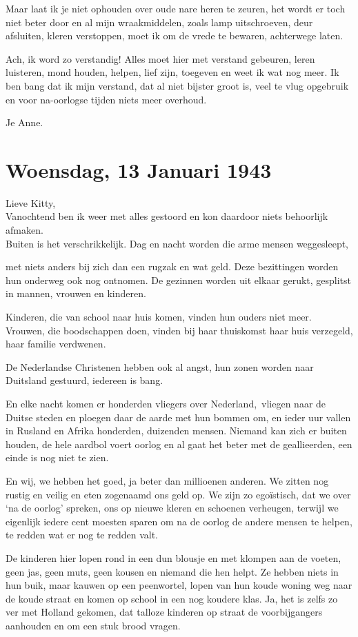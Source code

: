 \documentclass{book}
\begin{document}
Maar laat ik je niet ophouden over oude nare heren te zeuren, het wordt er toch
niet beter door en al mijn wraakmiddelen, zoals lamp uitschroeven, deur
afsluiten, kleren verstoppen, moet ik om de vrede te bewaren, achterwege laten.

Ach, ik word zo verstandig! Alles moet hier met verstand gebeuren, leren
luisteren, mond houden, helpen, lief zijn, toegeven en weet ik wat nog meer. Ik
ben bang dat ik mijn verstand, dat al niet bijster groot is, veel te vlug
opgebruik en voor na-oorlogse tijden niets meer overhoud.

Je Anne.

\section*{Woensdag, 13 Januari 1943}

Lieve Kitty,\\
Vanochtend ben ik weer met alles gestoord en kon daardoor niets
behoorlijk afmaken.\\
Buiten is het verschrikkelijk. Dag en nacht worden die
arme mensen weggesleept,

met niets anders bij zich dan een rugzak en wat geld. Deze bezittingen worden
hun onderweg ook nog ontnomen. De gezinnen worden uit elkaar gerukt, gesplitst
in mannen, vrouwen en kinderen.

Kinderen, die van school naar huis komen, vinden hun ouders niet meer.  Vrouwen,
die boodschappen doen, vinden bij haar thuiskomst haar huis verzegeld, haar
familie verdwenen.

De Nederlandse Christenen hebben ook al angst, hun zonen worden naar Duitsland
gestuurd, iedereen is bang.

En elke nacht komen er honderden vliegers over Nederland,~vliegen naar de Duitse
steden en ploegen daar de aarde met hun bommen om, en ieder uur vallen in
Rusland en Afrika honderden, duizenden mensen. Niemand kan zich er buiten
houden, de hele aardbol voert oorlog en al gaat het beter met de geallieerden,
een einde is nog niet te zien.

En wij, we hebben het goed, ja beter dan millioenen anderen. We zitten nog
rustig en veilig en eten zogenaamd ons geld op. We zijn zo egoïstisch, dat we
over `na de oorlog' spreken, ons op nieuwe kleren en schoenen verheugen, terwijl
we eigenlijk iedere cent moesten sparen om na de oorlog de andere mensen te
helpen, te redden wat er nog te redden valt.

De kinderen hier lopen rond in een dun blousje en met klompen aan de voeten,
geen jas, geen muts, geen kousen en niemand die hen helpt. Ze hebben niets in
hun buik, maar kauwen op een peenwortel, lopen van hun koude woning weg naar de
koude straat en komen op school in een nog koudere klas. Ja, het is zelfs zo ver
met Holland gekomen, dat talloze kinderen op straat de voorbijgangers aanhouden
en om een stuk brood vragen.
\end{document}
